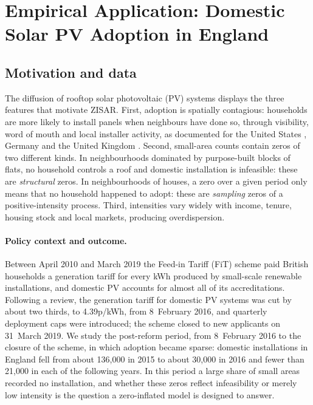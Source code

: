 \section{Empirical Application: Domestic Solar PV Adoption in England}\label{sec:application}

\subsection{Motivation and data}\label{sec:app_data}

The diffusion of rooftop solar photovoltaic (PV) systems displays the three features that motivate ZISAR.
First, adoption is spatially contagious: households are more likely to install panels when neighbours have done so, through visibility, word of mouth and local installer activity, as documented for the United States \citep{bollinger_gillingham2012,graziano_gillingham2015,kwan2012}, Germany \citep{rode_weber2016,dharshing2017,schaffer_brun2015} and the United Kingdom \citep{balta_ozkan2015,snape2016}.
Second, small-area counts contain zeros of two different kinds.
In neighbourhoods dominated by purpose-built blocks of flats, no household controls a roof and domestic installation is infeasible: these are \emph{structural} zeros.
In neighbourhoods of houses, a zero over a given period only means that no household happened to adopt: these are \emph{sampling} zeros of a positive-intensity process.
Third, intensities vary widely with income, tenure, housing stock and local markets, producing overdispersion.

\paragraph{Policy context and outcome.}
Between April 2010 and March 2019 the Feed-in Tariff (FiT) scheme paid British households a generation tariff for every kWh produced by small-scale renewable installations, and domestic PV accounts for almost all of its accreditations.
Following a review, the generation tariff for domestic PV systems was cut by about two thirds, to 4.39p/kWh, from 8~February 2016, and quarterly deployment caps were introduced; the scheme closed to new applicants on 31~March 2019.
We study the post-reform period, from 8~February 2016 to the closure of the scheme, in which adoption became sparse: domestic installations in England fell from about 136{,}000 in 2015 to about 30{,}000 in 2016 and fewer than 21{,}000 in each of the following years.
In this period a large share of small areas recorded no installation, and whether these zeros reflect infeasibility or merely low intensity is the question a zero-inflated model is designed to answer.

